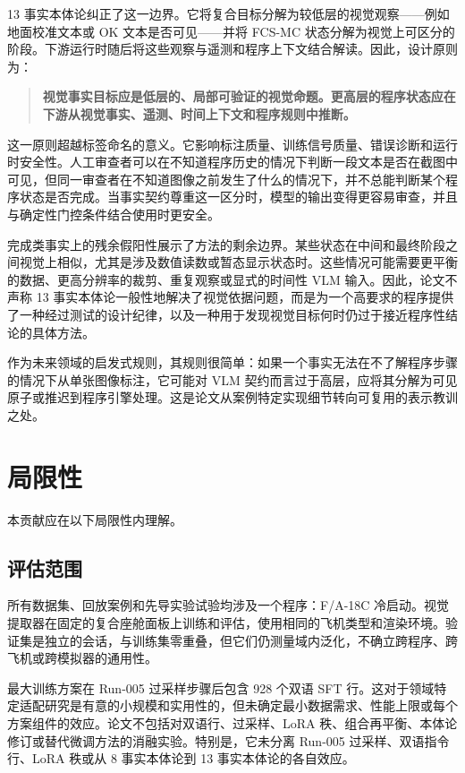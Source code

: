 13 事实本体论纠正了这一边界。它将复合目标分解为较低层的视觉观察——例如地面校准文本或 OK 文本是否可见——并将 FCS-MC 状态分解为视觉上可区分的阶段。下游运行时随后将这些观察与遥测和程序上下文结合解读。因此，设计原则为：

\begin{quote}
\textbf{视觉事实目标应是低层的、局部可验证的视觉命题。更高层的程序状态应在下游从视觉事实、遥测、时间上下文和程序规则中推断。}
\end{quote}

这一原则超越标签命名的意义。它影响标注质量、训练信号质量、错误诊断和运行时安全性。人工审查者可以在不知道程序历史的情况下判断一段文本是否在截图中可见，但同一审查者在不知道图像之前发生了什么的情况下，并不总能判断某个程序状态是否完成。当事实契约尊重这一区分时，模型的输出变得更容易审查，并且与确定性门控条件结合使用时更安全。

完成类事实上的残余假阳性展示了方法的剩余边界。某些状态在中间和最终阶段之间视觉上相似，尤其是涉及数值读数或暂态显示状态时。这些情况可能需要更平衡的数据、更高分辨率的裁剪、重复观察或显式的时间性 VLM 输入。因此，论文不声称 13 事实本体论一般性地解决了视觉依据问题，而是为一个高要求的程序提供了一种经过测试的设计纪律，以及一种用于发现视觉目标何时仍过于接近程序性结论的具体方法。

作为未来领域的启发式规则，其规则很简单：如果一个事实无法在不了解程序步骤的情况下从单张图像标注，它可能对 VLM 契约而言过于高层，应将其分解为可见原子或推迟到程序引擎处理。这是论文从案例特定实现细节转向可复用的表示教训之处。

\section{局限性}\label{sec:disc-limitations}

本贡献应在以下局限性内理解。

\subsection{评估范围}

所有数据集、回放案例和先导实验试验均涉及一个程序：F/A-18C 冷启动。视觉提取器在固定的复合座舱面板上训练和评估，使用相同的飞机类型和渲染环境。验证集是独立的会话，与训练集零重叠，但它们仍测量域内泛化，不确立跨程序、跨飞机或跨模拟器的通用性。

最大训练方案在 Run-005 过采样步骤后包含 928 个双语 SFT 行。这对于领域特定适配研究是有意的小规模和实用性的，但未确定最小数据需求、性能上限或每个方案组件的效应。论文不包括对双语行、过采样、LoRA 秩、组合再平衡、本体论修订或替代微调方法的消融实验。特别是，它未分离 Run-005 过采样、双语指令行、LoRA 秩或从 8 事实本体论到 13 事实本体论的各自效应。

